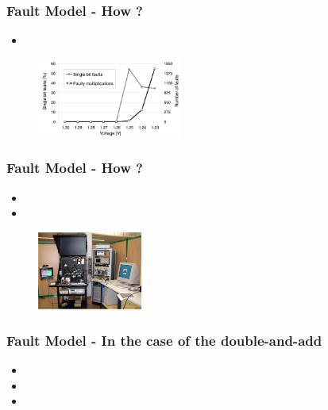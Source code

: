 \documentclass{beamer}
\begin{document}
    \begin{frame}
        \frametitle{Fault Model - How ?}
            \begin{itemize}
                \item {}
            \end{itemize}
            
            \begin{figure}
                \centering
                \includegraphics[width=180px]{img/power_disturbation}
            \end{figure}

    \end{frame}

    \begin{frame}
        \frametitle{Fault Model - How ?}
            \begin{itemize}
                \item {}
                \item \color{black}{With a laser}
            \end{itemize}
            
            \begin{figure}
                \centering
                \includegraphics[width=130px]{img/laser}
            \end{figure}

    \end{frame}

    \begin{frame}
        \frametitle{Fault Model - In the case of the double-and-add}

            \begin{itemize}
                \item \color{black}{Modification of a register}
                \item \color{black}{$\Rightarrow$ impact on one of the coordinates}
                \item \color{black}{Bit flip}
            \end{itemize}

    \end{frame}
\end{document}

